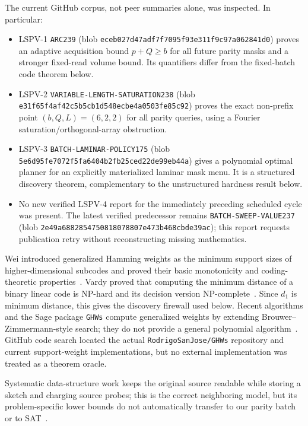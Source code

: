 \documentclass[11pt]{article}
\begin{document}
The current GitHub corpus, not peer summaries alone, was inspected.  In particular:
\begin{itemize}[leftmargin=*]
\item LSPV-1 \texttt{ARC239} (blob \texttt{eceb027d47adf7f7095f93e311f9c97a062841d0}) proves an adaptive acquisition bound $p+Q\ge b$ for all future parity masks and a stronger fixed-read volume bound.  Its quantifiers differ from the fixed-batch code theorem below.
\item LSPV-2 \texttt{VARIABLE-LENGTH-SATURATION238} (blob \texttt{e31f65f4af42c5b5cb1d548ecbe4a0503fe85c92}) proves the exact non-prefix point $(b,Q,L)=(6,2,2)$ for all parity queries, using a Fourier saturation/orthogonal-array obstruction.
\item LSPV-3 \texttt{BATCH-LAMINAR-POLICY175} (blob \texttt{5e6d95fe7072f5fa6404b2fb25ced22de99eb44a}) gives a polynomial optimal planner for an explicitly materialized laminar mask menu.  It is a structured discovery theorem, complementary to the unstructured hardness result below.
\item No new verified LSPV-4 report for the immediately preceding scheduled cycle was present.  The latest verified predecessor remains \texttt{BATCH-SWEEP-VALUE237} (blob \texttt{2e49a6882854750818078807e473b468cbde39ac}); this report requests publication retry without reconstructing missing mathematics.
\end{itemize}

Wei introduced generalized Hamming weights as the minimum support sizes of higher-dimensional subcodes and proved their basic monotonicity and coding-theoretic properties~\cite{wei}.  Vardy proved that computing the minimum distance of a binary linear code is NP-hard and its decision version NP-complete~\cite{vardy}.  Since $d_1$ is minimum distance, this gives the discovery firewall used below.  Recent algorithms and the Sage package \texttt{GHWs} compute generalized weights by extending Brouwer--Zimmermann-style search; they do not provide a general polynomial algorithm~\cite{ghwalg}.  GitHub code search located the actual \texttt{RodrigoSanJose/GHWs} repository and current support-weight implementations, but no external implementation was treated as a theorem oracle.

Systematic data-structure work keeps the original source readable while storing a sketch and charging source probes; this is the correct neighboring model, but its problem-specific lower bounds do not automatically transfer to our parity batch or to SAT~\cite{gal}.
\end{document}
